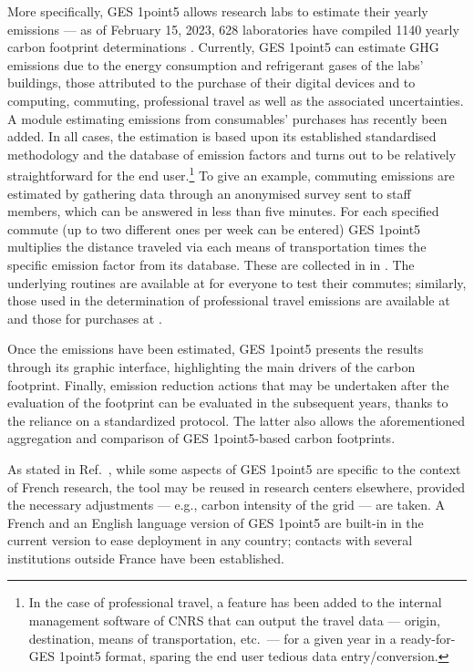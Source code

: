 \documentclass[../SustainableHEP.tex]{subfiles}
\begin{document}
\begin{bestpractice}
More specifically, GES 1point5 allows research labs to
estimate their yearly emissions --- as of February 15, 2023,
628 laboratories have compiled 1140 yearly carbon footprint 
determinations \cite{labos1p5web}.
Currently, GES 1point5 can estimate GHG emissions 
due to the energy consumption and refrigerant gases of the labs' buildings, 
those attributed to the purchase of their digital devices and to computing, 
commuting, professional travel as well as the associated uncertainties.
A module estimating emissions from consumables' purchases has recently been added.
In all cases, the estimation is based upon its established
standardised methodology and the database of emission factors and turns out 
to be relatively straightforward for the end user.\footnote{In the case
of professional travel, a feature has been added to the internal management software
of CNRS that can output the travel data --- origin, destination, means of transportation, etc.~---
for a given year in a ready-for-GES 1point5 format,
sparing the end user tedious data entry/conversion.} To give an example, 
commuting emissions are estimated by gathering data through an anonymised survey
sent to staff members, which can be answered in less than five minutes.
For each specified commute (up to two different ones per week can be entered)
GES 1point5 multiplies the distance traveled via each means of transportation times
the specific emission factor from its database. These are collected in  in .
The underlying routines are available at \cite{1p5commute} for everyone to test their 
commutes; similarly, those used in the determination of professional travel emissions are 
available at \cite{1p5travel} and those for purchases at 
\cite{1p5purchases}.

Once the emissions have been estimated, GES 1point5 presents the results 
through its graphic interface, highlighting the main drivers of the carbon footprint. 
Finally, emission reduction actions that may be undertaken after the evaluation of the 
footprint can be evaluated in the subsequent years, thanks to the reliance
on a standardized protocol. The latter also allows the aforementioned 
aggregation and comparison of GES 1point5-based carbon footprints.

As stated in Ref.~\cite{labos1p5}, while some aspects of GES 1point5 are specific 
to the context of French research, the tool  may be reused in research centers elsewhere, provided
the necessary adjustments --- e.g., carbon intensity of the grid --- are taken. 
A French and an English language version of GES 1point5 are built-in in the current version to ease deployment in any country; contacts with several institutions outside France 
have been established.
\end{bestpractice}
\end{document}
